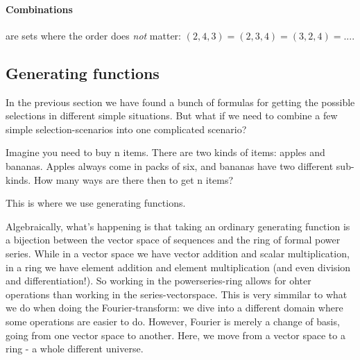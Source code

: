 \paragraph{Combinations} are sets where the order does \emph{not} matter: $(2, 4, 3) = (2, 3, 4) = (3, 2, 4) = ...$.



\subsection{Generating functions}

In the previous section we have found a bunch of formulas for getting the possible selections in different simple situations. But what if we need to combine a few simple selection-scenarios into one complicated scenario? 

Imagine you need to buy n items. There are two kinds of items: apples and bananas. Apples always come in packs of six, and bananas have two different sub-kinds. How many ways are there then to get n items?

This is where we use generating functions. 


Algebraically, what's happening is that taking an ordinary generating function is a bijection between the vector space of sequences and the ring of formal power series. While in a vector space we have vector addition and scalar multiplication, in a ring we have element addition and element multiplication (and even division and differentiation!). So working in the powerseries-ring allows for ohter operations than working in the series-vectorspace. This is very simmilar to what we do when doing the Fourier-transform: we dive into a different domain where some operations are easier to do. However, Fourier is merely a change of basis, going from one vector space to another. Here, we move from a vector space to a ring - a whole different universe. 



